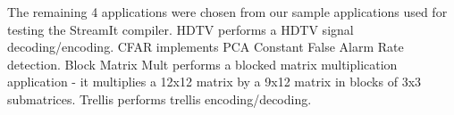 The remaining 4 applications were chosen from our sample
applications used for testing the StreamIt compiler. HDTV performs
a HDTV signal decoding/encoding. CFAR implements PCA Constant
False Alarm Rate detection. Block Matrix Mult performs a blocked
matrix multiplication application - it multiplies a 12x12 matrix
by a 9x12 matrix in blocks of 3x3 submatrices. Trellis performs
trellis encoding/decoding.

\begin{comment}

\subsection{Methodology}
\label{sec:results:methodology}

The following data has been collected: number of nodes, number of
node executions per steady state, schedule size and buffer size
for pseudo single appearance and minimal latency schedules.

\subsubsection{Schedule Compression}

\end{comment}

